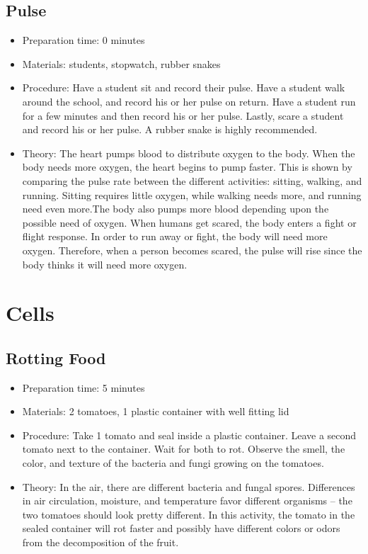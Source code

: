 \subsection{Pulse}
\begin{itemize}
\item{Preparation time: 0 minutes}
\item{Materials: students, stopwatch, rubber snakes}
\item{Procedure: Have a student sit and record their pulse. Have a student walk around the school, and record his or her pulse on return. Have a student run for a few minutes and then record his or her pulse. Lastly, scare a student and record his or her pulse. A rubber snake is highly recommended.}
\item{Theory: The heart pumps blood to distribute oxygen to the body. When the body needs more oxygen, the heart begins to pump faster. This is shown by comparing the pulse rate between the different activities: sitting, walking, and running. Sitting requires little oxygen, while walking needs more, and running need even more.The body also pumps more blood depending upon the possible need of oxygen. When humans get scared, the body enters a fight or flight response. In order to run away or fight, the body will need more oxygen. Therefore, when a person becomes scared, the pulse will rise since the body thinks it will need more oxygen.}
\end{itemize}

\section{Cells}
\subsection{Rotting Food}
\begin{itemize}
\item{Preparation time: 5 minutes}
\item{Materials: 2 tomatoes, 1 plastic container with well fitting lid}
\item{Procedure: Take 1 tomato and seal inside a plastic container. Leave a second tomato next to the container. Wait for both to rot. Observe the smell, the color, and texture of the bacteria and fungi growing on the tomatoes.}
\item{Theory: In the air, there are different bacteria and fungal spores. Differences in air circulation, moisture, and temperature favor different organisms – the two tomatoes should look pretty different. In this activity, the tomato in the sealed container will rot faster and possibly have different colors or odors from the decomposition of the fruit.}
\end{itemize}


